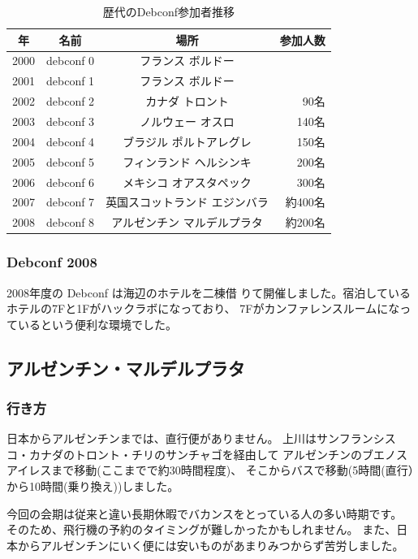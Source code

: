\documentclass[mingoth,a4paper]{jsarticle}
\begin{document}
\begin{table}[H]
\caption{歴代のDebconf参加者推移}
\label{tab:debconflist8}
 \begin{center}
 {\footnotesize
 \begin{tabular}{|c|c|c|r|}
 \hline
 年 & 名前 & 場所 & 参加人数 \\
 \hline
 2000 & debconf 0 &フランス ボルドー & \\
 2001 & debconf 1 &フランス ボルドー & \\
 2002 & debconf 2 &カナダ トロント & 90名 \\
 2003 & debconf 3 &ノルウェー オスロ & 140名 \\
 2004 & debconf 4 &ブラジル ポルトアレグレ &  150名 \\
 2005 & debconf 5 &フィンランド ヘルシンキ & 200名 \\
 2006 & debconf 6 &メキシコ オアスタペック & 300名 \\
 2007 & debconf 7 &英国スコットランド エジンバラ & 約400名 \\
 2008 & debconf 8 &アルゼンチン マルデルプラタ & 約200名 \\
 \hline
 \end{tabular}
 }
 \end{center}
\end{table}

\subsubsection{Debconf 2008} 2008年度の Debconf は海辺のホテルを二棟借
りて開催しました。宿泊しているホテルの7Fと1Fがハックラボになっており、
7Fがカンファレンスルームになっているという便利な環境でした。

\subsection{アルゼンチン・マルデルプラタ}

\subsubsection{行き方}
  日本からアルゼンチンまでは、直行便がありません。
  上川はサンフランシスコ・カナダのトロント・チリのサンチャゴを経由して
  アルゼンチンのブエノスアイレスまで移動(ここまでで約30時間程度)、
  そこからバスで移動(5時間(直行）から10時間(乗り換え))しました。

  今回の会期は従来と違い長期休暇でバカンスをとっている人の多い時期です。
そのため、飛行機の予約のタイミングが難しかったかもしれません。
また、日本からアルゼンチンにいく便には安いものがあまりみつからず苦労しました。
\end{document}
